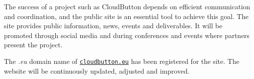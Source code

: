 \documentclass[a4paper,11pt]{article}
\numberwithin{table}{subsection} %
\begin{document}
The success of a project such as CloudButton depends on efficient communication and coordination, and the public site is an essential tool to achieve this goal. 
The site provides public information, news, events and deliverables.
It will be promoted through social media and during conferences and events where partners present the project.

The \textit{.eu} domain name of \href{http://cloudbutton.eu}{\texttt{cloudbutton.eu}} has been registered for the site.
The website will be continuously updated, adjusted and improved.


\newpage %
\end{document}
